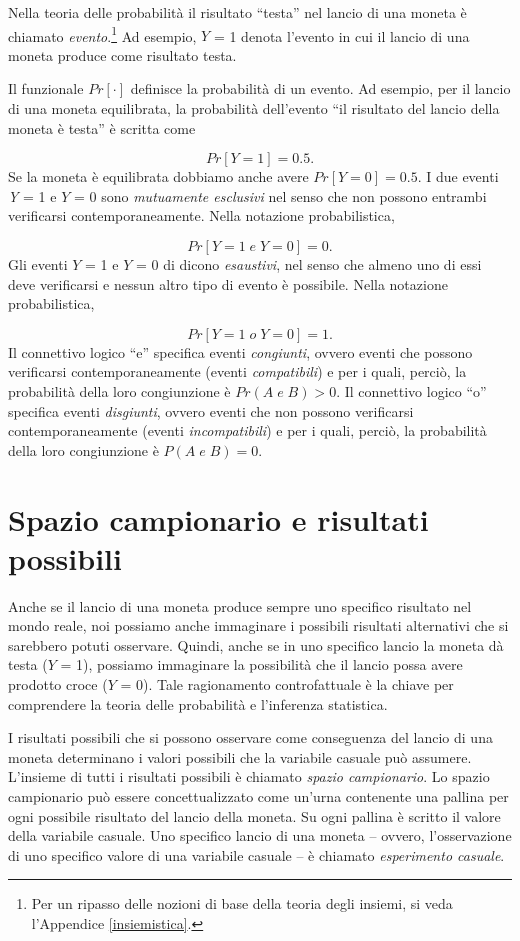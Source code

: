 \documentclass[
  11pt,
]{krantz}
\theoremstyle{definition}
\theoremstyle{definition}
\theoremstyle{definition}
\theoremstyle{definition}
\theoremstyle{remark}
\begin{document}
Nella teoria delle probabilità il risultato ``testa'' nel lancio di una moneta è chiamato \emph{evento}.\footnote{Per un ripasso delle nozioni di base della teoria degli insiemi, si veda l'Appendice \ref{insiemistica}.} Ad esempio, \(Y\) = 1 denota l'evento in cui il lancio di una moneta produce come risultato testa.

Il funzionale \(Pr[·]\) definisce la probabilità di un evento. Ad esempio, per il lancio di una moneta equilibrata, la probabilità dell'evento ``il risultato del lancio della moneta è testa'' è scritta come

\[
Pr[Y = 1] = 0.5.
\] Se la moneta è equilibrata dobbiamo anche avere \(Pr[Y = 0] = 0.5\). I due eventi \emph{Y} = 1 e \(Y\) = 0 sono \emph{mutuamente esclusivi} nel senso che non possono entrambi verificarsi contemporaneamente. Nella notazione probabilistica,

\[
Pr[Y = 1\; e \; Y = 0] = 0.
\] Gli eventi \(Y\) = 1 e \(Y\) = 0 di dicono \emph{esaustivi}, nel senso che almeno uno di essi deve verificarsi e nessun altro tipo di evento è possibile. Nella notazione probabilistica,

\[
Pr[Y = 1\; o \; Y = 0] = 1.
\] Il connettivo logico ``e'' specifica eventi \emph{congiunti}, ovvero eventi che possono verificarsi contemporaneamente (eventi \emph{compatibili}) e per i quali, perciò, la probabilità della loro congiunzione è \(Pr(A \; e \; B) > 0\). Il connettivo logico ``o'' specifica eventi \emph{disgiunti}, ovvero eventi che non possono verificarsi contemporaneamente (eventi \emph{incompatibili}) e per i quali, perciò, la probabilità della loro congiunzione è \(P(A \; e \; B) = 0\).

\hypertarget{spazio-campionario-e-risultati-possibili}{%
\section{Spazio campionario e risultati possibili}\label{spazio-campionario-e-risultati-possibili}}

Anche se il lancio di una moneta produce sempre uno specifico risultato nel mondo reale, noi possiamo anche immaginare i possibili risultati alternativi che si sarebbero potuti osservare. Quindi, anche se in uno specifico lancio la moneta dà testa (\(Y\) = 1), possiamo immaginare la possibilità che il lancio possa avere prodotto croce (\(Y\) = 0). Tale ragionamento controfattuale è la chiave per comprendere la teoria delle probabilità e l'inferenza statistica.

I risultati possibili che si possono osservare come conseguenza del lancio di una moneta determinano i valori possibili che la variabile casuale può assumere. L'insieme di tutti i risultati possibili è chiamato \emph{spazio campionario}. Lo spazio campionario può essere concettualizzato come un'urna contenente una pallina per ogni possibile risultato del lancio della moneta. Su ogni pallina è scritto il valore della variabile casuale. Uno specifico lancio di una moneta -- ovvero, l'osservazione di uno specifico valore di una variabile casuale -- è chiamato \emph{esperimento casuale}.
\end{document}
